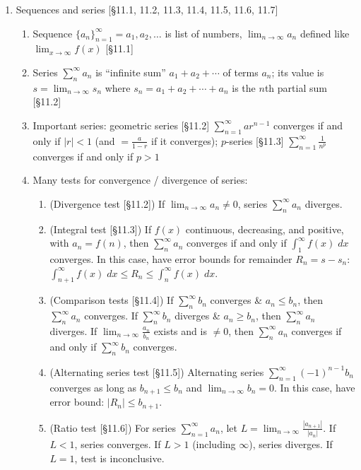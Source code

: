 \documentclass[11pt]{article}
\begin{document}
\begin{enumerate}
\item Sequences and series [\S11.1, 11.2, 11.3, 11.4, 11.5, 11.6, 11.7]
\begin{enumerate}
\item Sequence $\{a_n\}_{n=1}^{\infty} = a_1,a_2,\ldots$ is list of numbers, $\displaystyle \lim_{n\to \infty} a_n$ defined like $\displaystyle \lim_{x \to \infty} f(x)$ [\S11.1]
\item Series $\sum_{n}^{\infty} a_n$ is ``infinite sum'' $a_1+a_2+\cdots$ of terms $a_n$; its value is $s=\lim_{n\to\infty} s_n$ where $s_n = a_1+a_2+\cdots+a_n$ is the $n$th partial sum [\S11.2]
\item Important series: geometric series [\S11.2] $\sum_{n=1}^{\infty} ar^{n-1}$ converges if and only if $|r|<1$ (and $=\frac{a}{1-r}$ if it converges); $p$-series [\S11.3] $\sum_{n=1}^{\infty}\frac{1}{n^p}$ converges if and only if $p > 1$ 
\item Many tests for convergence / divergence of series:
\begin{enumerate}
\item (Divergence test [\S11.2]) If $\lim_{n\to \infty} a_n \neq 0$, series $\sum_{n}^{\infty} a_n$ diverges.
\item (Integral test [\S11.3]) If $f(x)$ continuous, decreasing, and positive, with $a_n = f(n)$, then $\sum_{n}^{\infty} a_n$ converges if and only if $\int_{1}^{\infty} f(x) \; dx$ converges. In this case, have error bounds for remainder $R_n = s-s_n$: $\int_{n+1}^{\infty} f(x) \; dx \leq R_n \leq \int_{n}^{\infty} f(x) \; dx$.
\item (Comparison tests [\S11.4]) If $\sum_{n}^{\infty} b_n$ converges \& $a_n \leq b_n$, then $\sum_{n}^{\infty} a_n$ converges. If $\sum_{n}^{\infty} b_n$ diverges \& $a_n \geq b_n$, then $\sum_{n}^{\infty} a_n$ diverges. If $\lim_{n\to\infty} \frac{a_n}{b_n}$ exists and is $\neq 0$, then $\sum_{n}^{\infty} a_n$ converges if and only if $\sum_{n}^{\infty} b_n$ converges.
\item (Alternating series test [\S11.5]) Alternating series $\sum_{n=1}^{\infty} (-1)^{n-1} b_n$ converges as long as $b_{n+1} \leq b_n$ and $\lim_{n\to\infty} b_n=0$. In this case, have error bound: $|R_n| \leq b_{n+1}$.
\item (Ratio test [\S11.6]) For series $\sum_{n=1}^{\infty} a_n$, let $L = \lim_{n\to \infty} \frac{|a_{n+1}|}{|a_n|}$. If $L < 1$, series converges. If $L > 1$ (including $\infty$), series diverges. If $L=1$, test is inconclusive.
\end{enumerate}
\end{enumerate}


\end{enumerate}
\end{document}
